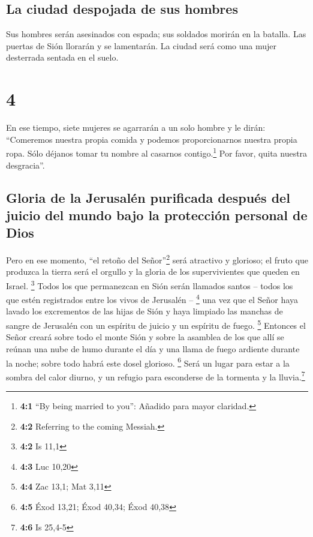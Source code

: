 \hypertarget{la-ciudad-despojada-de-sus-hombres}{%
\subsection{La ciudad despojada de sus
hombres}\label{la-ciudad-despojada-de-sus-hombres}}

 Sus hombres serán asesinados con espada; sus soldados
morirán en la batalla.  Las puertas de Sión llorarán y se
lamentarán. La ciudad será como una mujer desterrada sentada en el
suelo.

\hypertarget{section-3}{%
\section{4}\label{section-3}}

 En ese tiempo, siete mujeres se agarrarán a un solo
hombre y le dirán: ``Comeremos nuestra propia comida y podemos
proporcionarnos nuestra propia ropa. Sólo déjanos tomar tu nombre al
casarnos contigo.\footnote{\textbf{4:1} ``By being married to you'':
  Añadido para mayor claridad.} Por favor, quita nuestra desgracia''.

\hypertarget{gloria-de-la-jerusaluxe9n-purificada-despuuxe9s-del-juicio-del-mundo-bajo-la-protecciuxf3n-personal-de-dios}{%
\subsection{Gloria de la Jerusalén purificada después del juicio del
mundo bajo la protección personal de
Dios}\label{gloria-de-la-jerusaluxe9n-purificada-despuuxe9s-del-juicio-del-mundo-bajo-la-protecciuxf3n-personal-de-dios}}

 Pero en ese momento, ``el retoño del Señor''\footnote{\textbf{4:2}
  Referring to the coming Messiah.} será atractivo y glorioso; el fruto
que produzca la tierra será el orgullo y la gloria de los supervivientes
que queden en Israel. \footnote{\textbf{4:2} Is 11,1} 
Todos los que permanezcan en Sión serán llamados santos -- todos los que
estén registrados entre los vivos de Jerusalén -- \footnote{\textbf{4:3}
  Luc 10,20}  una vez que el Señor haya lavado los
excrementos de las hijas de Sión y haya limpiado las manchas de sangre
de Jerusalén con un espíritu de juicio y un espíritu de fuego.
\footnote{\textbf{4:4} Zac 13,1; Mat 3,11}  Entonces el
Señor creará sobre todo el monte Sión y sobre la asamblea de los que
allí se reúnan una nube de humo durante el día y una llama de fuego
ardiente durante la noche; sobre todo habrá este dosel glorioso.
\footnote{\textbf{4:5} Éxod 13,21; Éxod 40,34; Éxod 40,38}
 Será un lugar para estar a la sombra del calor diurno, y
un refugio para esconderse de la tormenta y la lluvia.\footnote{\textbf{4:6}
  Is 25,4-5}

